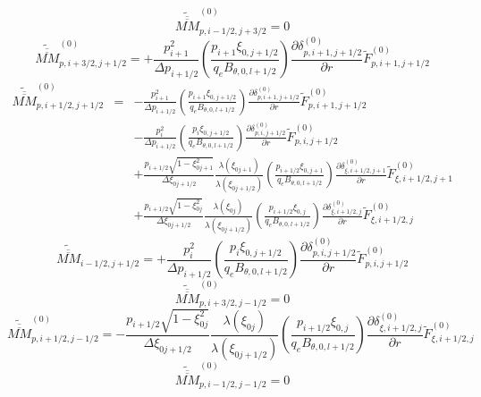  \[
\widetilde{\overline{\overline{MM}}}_{p,i-1/2,j+3/2}^{\left(0\right)}=0\]
 \[
\widetilde{\overline{\overline{MM}}}_{p,i+3/2,j+1/2}^{\left(0\right)}=+\frac{p_{i+1}^{2}}{\Delta p_{i+1/2}}\left(\frac{p_{i+1}\xi_{0,j+1/2}}{q_{e}B_{\theta,0,l+1/2}}\right)\frac{\partial\delta_{p,i+1,j+1/2}^{(0)}}{\partial r}\widetilde{F}_{p,i+1,j+1/2}^{\left(0\right)}\]
\begin{eqnarray*}
\widetilde{\overline{\overline{MM}}}_{p,i+1/2,j+1/2}^{\left(0\right)} & = & -\frac{p_{i+1}^{2}}{\Delta p_{i+1/2}}\left(\frac{p_{i+1}\xi_{0,j+1/2}}{q_{e}B_{\theta,0,l+1/2}}\right)\frac{\partial\delta_{p,i+1,j+1/2}^{(0)}}{\partial r}\widetilde{F}_{p,i+1,j+1/2}^{\left(0\right)}\\
 &  & -\frac{p_{i}^{2}}{\Delta p_{i+1/2}}\left(\frac{p_{i}\xi_{0,j+1/2}}{q_{e}B_{\theta,0,l+1/2}}\right)\frac{\partial\delta_{p,i,j+1/2}^{(0)}}{\partial r}\widetilde{F}_{p,i,j+1/2}^{\left(0\right)}\\
 &  & +\frac{p_{i+1/2}\sqrt{1-\xi_{0j+1}^{2}}}{\Delta\xi_{0j+1/2}}\frac{\lambda\left(\xi_{0j+1}\right)}{\lambda\left(\xi_{0j+1/2}\right)}\left(\frac{p_{i+1/2}\xi_{0,j+1}}{q_{e}B_{\theta,0,l+1/2}}\right)\frac{\partial\delta_{\xi,i+1/2,j+1}^{(0)}}{\partial r}\widetilde{F}_{\xi,i+1/2,j+1}^{\left(0\right)}\\
 &  & +\frac{p_{i+1/2}\sqrt{1-\xi_{0j}^{2}}}{\Delta\xi_{0j+1/2}}\frac{\lambda\left(\xi_{0j}\right)}{\lambda\left(\xi_{0j+1/2}\right)}\left(\frac{p_{i+1/2}\xi_{0,j}}{q_{e}B_{\theta,0,l+1/2}}\right)\frac{\partial\delta_{\xi,i+1/2,j}^{(0)}}{\partial r}\widetilde{F}_{\xi,i+1/2,j}^{\left(0\right)}\end{eqnarray*}
 \[
\widetilde{\overline{\overline{MM}}}_{i-1/2,j+1/2}=+\frac{p_{i}^{2}}{\Delta p_{i+1/2}}\left(\frac{p_{i}\xi_{0,j+1/2}}{q_{e}B_{\theta,0,l+1/2}}\right)\frac{\partial\delta_{p,i,j+1/2}^{(0)}}{\partial r}\widetilde{F}_{p,i,j+1/2}^{\left(0\right)}\]
 \[
\widetilde{\overline{\overline{MM}}}_{p,i+3/2,j-1/2}^{\left(0\right)}=0\]
 \[
\widetilde{\overline{\overline{MM}}}_{p,i+1/2,j-1/2}^{\left(0\right)}=-\frac{p_{i+1/2}\sqrt{1-\xi_{0j}^{2}}}{\Delta\xi_{0j+1/2}}\frac{\lambda\left(\xi_{0j}\right)}{\lambda\left(\xi_{0j+1/2}\right)}\left(\frac{p_{i+1/2}\xi_{0,j}}{q_{e}B_{\theta,0,l+1/2}}\right)\frac{\partial\delta_{\xi,i+1/2,j}^{(0)}}{\partial r}\widetilde{F}_{\xi,i+1/2,j}^{\left(0\right)}\]
 \[
\widetilde{\overline{\overline{MM}}}_{p,i-1/2,j-1/2}^{\left(0\right)}=0\]


